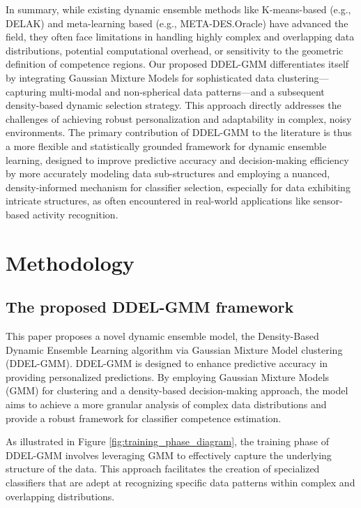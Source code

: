 \documentclass[lettersize,journal]{IEEEtran}
\newcommand{\greenhighlight}[1]{\textcolor{highlightgreen}{#1}}
\begin{document}
\greenhighlight{In summary, while existing dynamic ensemble methods like K-means-based (e.g., DELAK) and meta-learning based (e.g., META-DES.Oracle) have advanced the field, they often face limitations in handling highly complex and overlapping data distributions, potential computational overhead, or sensitivity to the geometric definition of competence regions. Our proposed DDEL-GMM differentiates itself by integrating Gaussian Mixture Models for sophisticated data clustering—capturing multi-modal and non-spherical data patterns—and a subsequent density-based dynamic selection strategy. This approach directly addresses the challenges of achieving robust personalization and adaptability in complex, noisy environments. The primary contribution of DDEL-GMM to the literature is thus a more flexible and statistically grounded framework for dynamic ensemble learning, designed to improve predictive accuracy and decision-making efficiency by more accurately modeling data sub-structures and employing a nuanced, density-informed mechanism for classifier selection, especially for data exhibiting intricate structures, as often encountered in real-world applications like sensor-based activity recognition.}
	\section{Methodology}
	
	\subsection{The proposed DDEL-GMM framework}
	
	\noindent This paper proposes a novel dynamic ensemble model, the Density-Based Dynamic Ensemble Learning algorithm via Gaussian Mixture Model clustering (DDEL-GMM). \greenhighlight{DDEL-GMM is designed to enhance predictive accuracy in providing personalized predictions.} By employing Gaussian Mixture Models (GMM) for clustering and a density-based decision-making approach, \greenhighlight{the model aims to achieve} a more granular analysis of complex data distributions and \greenhighlight{provide} a robust framework for classifier competence estimation.
	
	As illustrated in Figure \ref{fig:training_phase_diagram}, the training phase of \greenhighlight{DDEL-GMM} involves leveraging GMM to effectively capture the underlying structure of the data. This approach facilitates the creation of specialized classifiers that are adept at recognizing specific data patterns within complex and overlapping distributions.
	
\end{document}
